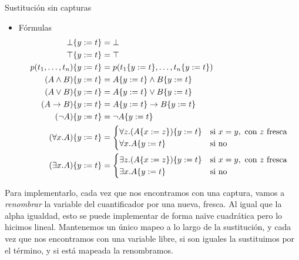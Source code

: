 \begin{definition}{Sustitución sin capturas}
\begin{itemize}
        \item Fórmulas
        \begin{align*}    
            \bot\{y := t\} &= \bot\\
            \top\{y := t\} &= \top\\
            p(t_1, \dots, t_n)\{y := t\} &=
            p(
                    t_1\{y := t\},
                    \dots,
                    t_n\{y := t\}
                )
            \\
            (A \wedge B)\{y := t\} &= 
                A\{y := t\} \wedge B\{y := t\}\\
            (A \vee B)\{y := t\} &=
            A\{y := t\} \vee B\{y := t\}\\
            (A \to B)\{y := t\} &=
            A\{y := t\} \to B\{y := t\}\\
            (\neg A)\{y := t\} &=
                \neg A\{y := t\}\\
            (\forall x . A)\{y := t\} &=
            \begin{cases}
                \forall z . (A\{x := z\})\{y := t\}
                    &\text{si } x = y, \text{ con } z \text{ fresca}\\
                \forall x . A\{y := t\} &\text{si no}
            \end{cases}
            \\
            (\exists x . A)\{y := t\} &=
            \begin{cases}
                \exists z . (A\{x := z\})\{y := t\}
                    &\text{si } x = y, \text{ con } z \text{ fresca}\\
                \exists x . A\{y := t\} &\text{si no}
            \end{cases}
        \end{align*}

    \end{itemize}
\end{definition}

Para implementarlo, cada vez que nos encontramos con una captura, vamos a \textit{renombrar} la variable del cuantificador por una nueva, fresca. Al igual que la alpha igualdad, esto se puede implementar de forma naïve cuadrática pero lo hicimos lineal. Mantenemos un único mapeo a lo largo de la sustitución, y cada vez que nos encontramos con una variable libre, si son iguales la sustituimos por el término, y si está mapeada la renombramos.

